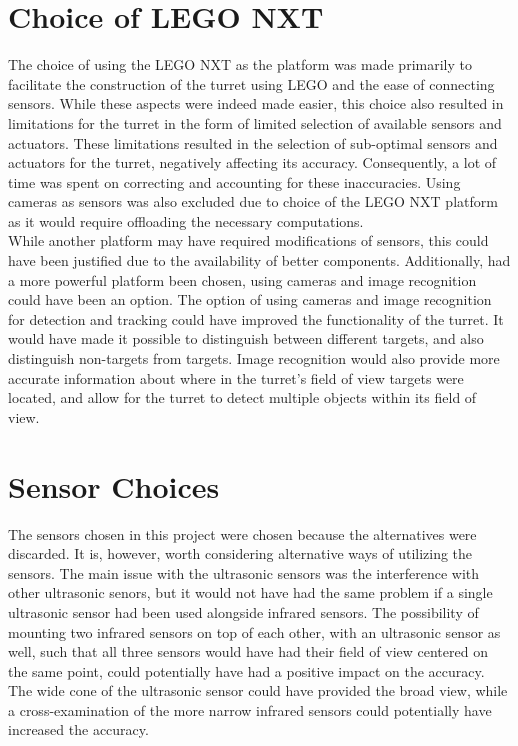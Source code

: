 \section{Choice of LEGO NXT}
The choice of using the LEGO NXT as the platform was made primarily to facilitate the construction of the turret using LEGO and the ease of connecting sensors. While these aspects were indeed made easier, this choice also resulted in limitations for the turret in the form of limited selection of available sensors and actuators. These limitations resulted in the selection of sub-optimal sensors and actuators for the turret, negatively affecting its accuracy. Consequently, a lot of time was spent on correcting and accounting for these inaccuracies. Using cameras as sensors was also excluded due to choice of the LEGO NXT platform as it would require offloading the necessary computations. \\

While another platform may have required modifications of sensors, this could have been justified due to the availability of better components. Additionally, had a more powerful platform been chosen, using cameras and image recognition could have been an option. The option of using cameras and image recognition for detection and tracking could have improved the functionality of the turret. It would have made it possible to distinguish between different targets, and also distinguish non-targets from targets. Image recognition would also provide more accurate information about where in the turret's field of view targets were located, and allow for the turret to detect multiple objects within its field of view. 

\section{Sensor Choices}
The sensors chosen in this project were chosen because the alternatives were discarded. It is, however, worth considering alternative ways of utilizing the sensors. The main issue with the ultrasonic sensors was the interference with other ultrasonic senors, but it would not have had the same problem if a single ultrasonic sensor had been used alongside infrared sensors. The possibility of mounting two infrared sensors on top of each other, with an ultrasonic sensor as well, such that all three sensors would have had their field of view centered on the same point, could potentially have had a positive impact on the accuracy. The wide cone of the ultrasonic sensor could have provided the broad view, while a cross-examination of the more narrow infrared sensors could potentially have increased the accuracy. \\

